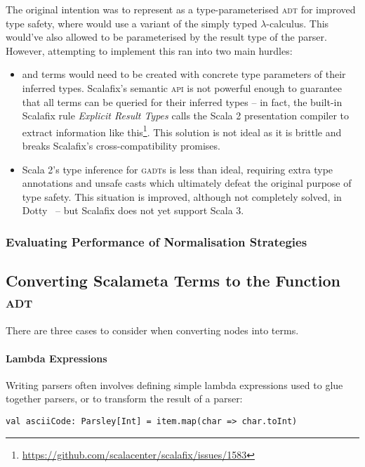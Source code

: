 \documentclass[../../../main.tex]{subfiles}
\begin{document}
The original intention was to represent  as a type-parameterised \textsc{adt} for improved type safety, where  would use a variant of the simply typed $\lambda$-calculus.
This would've also allowed  to be parameterised by the result type of the parser.
However, attempting to implement this ran into two main hurdles:
\begin{itemize}
  \item {} and  terms would need to be created with concrete type parameters of their inferred types. Scalafix's semantic \textsc{api} is not powerful enough to guarantee that all terms can be queried for their inferred types -- in fact, the built-in Scalafix rule \emph{Explicit Result Types} calls the Scala 2 presentation compiler to extract information like this\footnote{\url{https://github.com/scalacenter/scalafix/issues/1583}}. This solution is not ideal as it is brittle and breaks Scalafix's cross-compatibility promises.
  \item Scala 2's type inference for \textsc{gadt}s is less than ideal, requiring extra type annotations and unsafe casts which ultimately defeat the original purpose of type safety. This situation is improved, although not completely solved, in Dotty~\cite{parreaux_towards_2019} -- but Scalafix does not yet support Scala 3.
\end{itemize}

\subsubsection{Evaluating Performance of Normalisation Strategies}

\subsection{Converting Scalameta Terms to the Function \textsc{adt}}
There are three cases to consider when converting  nodes into  terms.

\paragraph{Lambda Expressions}
Writing parsers often involves defining simple lambda expressions used to glue together parsers, or to transform the result of a parser:
\begin{verbatim}
val asciiCode: Parsley[Int] = item.map(char => char.toInt)
\end{verbatim}
\end{document}
